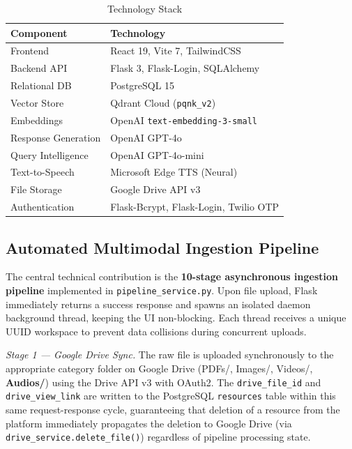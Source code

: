 \documentclass[conference]{IEEEtran}
\begin{document}
\begin{table}[h!]
\centering
\caption{Technology Stack}
\label{tab:stack}
\begin{tabular}{ll}
\toprule
\textbf{Component} & \textbf{Technology} \\
\midrule
Frontend & React 19, Vite 7, TailwindCSS \\
Backend API & Flask 3, Flask-Login, SQLAlchemy \\
Relational DB & PostgreSQL 15 \\
Vector Store & Qdrant Cloud (\texttt{pqnk\_v2}) \\
Embeddings & OpenAI \texttt{text-embedding-3-small} \\
Response Generation & OpenAI GPT-4o \\
Query Intelligence & OpenAI GPT-4o-mini \\
Text-to-Speech & Microsoft Edge TTS (Neural) \\
File Storage & Google Drive API v3 \\
Authentication & Flask-Bcrypt, Flask-Login, Twilio OTP \\
\bottomrule
\end{tabular}
\end{table}

\subsection{Automated Multimodal Ingestion Pipeline}

The central technical contribution is the \textbf{10-stage asynchronous ingestion pipeline}
implemented in \texttt{pipeline\_service.py}. Upon file upload, Flask immediately returns a
success response and spawns an isolated daemon background thread, keeping the UI non-blocking.
Each thread receives a unique UUID workspace to prevent data collisions during concurrent uploads.

\textit{Stage 1 — Google Drive Sync.}
The raw file is uploaded synchronously to the appropriate category folder on Google Drive
(PDFs/, Images/, Videos/, \textbf{Audios/}) using the Drive API v3 with OAuth2.
The \texttt{drive\_file\_id} and \texttt{drive\_view\_link} are written to the PostgreSQL
\texttt{resources} table within this same request-response cycle, guaranteeing that
deletion of a resource from the platform immediately propagates the deletion to Google Drive
(via \texttt{drive\_service.delete\_file()}) regardless of pipeline processing state.
\end{document}
